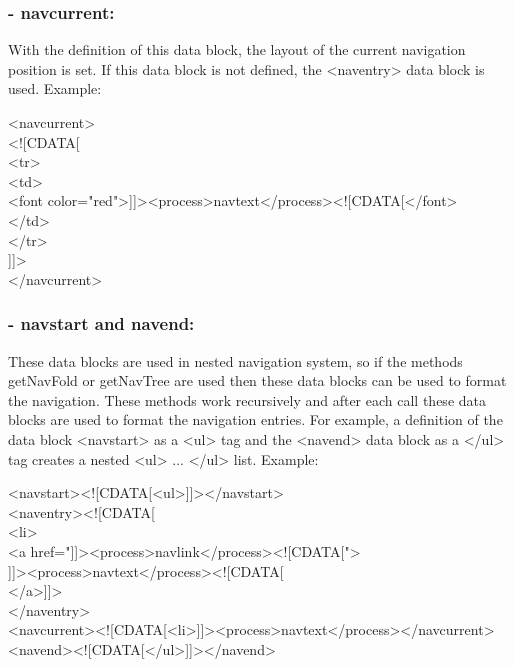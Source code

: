 \subsubsection{- navcurrent:} 

  With the definition of this data block, the layout of the current 
navigation position is set. If this data block is not defined, the 
{\tag <naventry>} data block is used. Example: \\

  \begin{xml}
  <navcurrent> \\
  <![CDATA[ \\
  <tr> \\
  \xtaba <td> \\
  \xtabb   <font color="red">]]><process>navtext</process><![CDATA[</font> \\
  \xtaba </td> \\
  </tr> \\
  ]]> \\
  </navcurrent> \\
  \end{xml}

\subsubsection{- navstart and navend:}  

  These data blocks are used in nested navigation system, so if the methods 
{\name getNavFold} or {\name getNavTree} are used then these data blocks 
can be used to format the navigation. These methods work recursively and 
after each call these data blocks are used to format the navigation entries. 
For example, a definition of the data block {\tag <navstart>} 
as a {\tag <ul>} tag and the {\tag <navend>} data block as a {\tag </ul>} 
tag creates a nested {\tag <ul>} ... {\tag </ul>} list. Example: \\

  \begin{xml}
  <navstart><![CDATA[<ul>]]></navstart> \\
  <naventry><![CDATA[ \\
    \xtaba <li> \\
    \xtaba <a href="]]><process>navlink</process><![CDATA["> \\
    \xtabb ]]><process>navtext</process><![CDATA[ \\
    \xtaba </a>]]> \\
  </naventry> \\
  <navcurrent><![CDATA[<li>]]><process>navtext</process></navcurrent> \\
  <navend><![CDATA[</ul>]]></navend> \\
  \end{xml}

